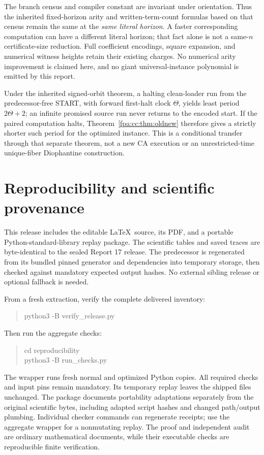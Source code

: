\documentclass[11pt,a4paper]{article}
\numberwithin{equation}{section}
\begin{document}
The branch census and compiler constant are invariant under orientation.
Thus the inherited fixed-horizon arity and written-term-count formulas
based on that census remain the same at the \emph{same literal horizon}.
A faster corresponding computation can have a different literal horizon;
that fact alone is not a same-$n$ certificate-size reduction. Full
coefficient encodings, square expansion, and numerical witness heights
retain their existing charges. No numerical arity improvement is claimed
here, and no giant universal-instance polynomial is emitted by this report.

Under the inherited signed-orbit theorem, a halting clean-loader run from
the predecessor-free START, with forward first-halt clock $\Theta$, yields
least period $2\Theta+2$; an infinite promised source run never returns to
the encoded start. If the paired computation halts,
Theorem~\ref{fpa:cc:thm:oldnew} therefore gives a strictly shorter such period for
the optimized instance. This is a conditional transfer through that
separate theorem, not a new CA execution or an unrestricted-time
unique-fiber Diophantine construction.
\newpage

\section{Reproducibility and scientific provenance}
\label{fpa:cc:sec:reproduce}
This release includes the editable \LaTeX\ source, its PDF, and a portable
Python-standard-library replay package. The scientific tables and saved
traces are byte-identical to the sealed Report 17 release. The predecessor
is regenerated from its bundled pinned generator and dependencies into
temporary storage, then checked against mandatory expected output hashes.
No external sibling release or optional fallback is needed.

From a fresh extraction, verify the complete delivered inventory:
\begin{quote}\ttfamily\small
python3 -B verify\_release.py
\end{quote}
Then run the aggregate checks:
\begin{quote}\ttfamily\small
cd reproducibility\\
python3 -B run\_checks.py
\end{quote}
The wrapper runs fresh normal and optimized Python copies. All required
checks and input pins remain mandatory. Its temporary replay leaves the
shipped files unchanged. The package documents portability adaptations
separately from the original scientific bytes, including adapted script
hashes and changed path/output plumbing. Individual checker commands can
regenerate receipts; use the aggregate wrapper for a nonmutating replay.
The proof and independent audit are ordinary mathematical documents,
while their executable checks are reproducible finite verification.
\end{document}
